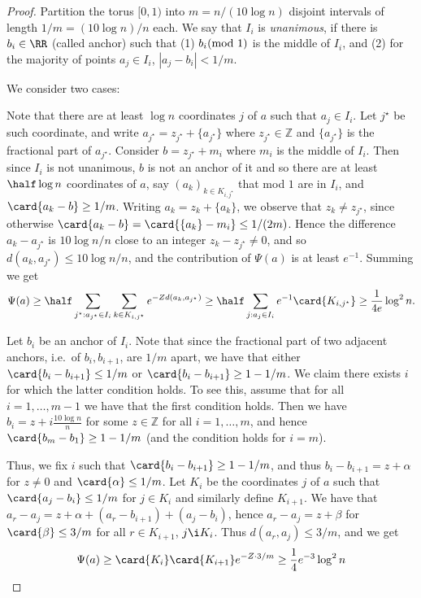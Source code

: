 \begin{proof}
 Partition the torus $[0,1)$ into $m = n/(10 \log n)$ disjoint intervals of length $1/m = (10 \log n)/n$ each.
 We say that $I_i$ is {\em unanimous}, if there is $b_i\in \RR$ (called anchor) such that
 (1) $b_i\hspace{-1ex}\pmod{1}$ is the middle of $I_i$, and (2) for the majority of points $a_j\in I_i$, $|a_j-b_i|< 1/m$.

 We consider two cases:

 Note that there are at least $\log n$ coordinates $j$ of $a$ such that $a_j\in I_i$.
Let $j^{\star}$ be such coordinate, and write $a_{j^{\star}} = z_{j^{\star}} + \{a_{j^{\star}}\}$ where $z_{j^{\star}}\in\mathbb{Z}$ and
$\{a_{j^{\star}}\}$ is the fractional part of $a_{j^{\star}}$. Consider
$b = z_{j^{\star}} + m_i$ where $m_i$ is the middle of $I_i$. Then since $I_i$ is not unanimous, $b$ is not an anchor of it and so there are at least $\half \log n$
coordinates of $a$, say $(a_k)_{k\in K_{i,j^{\star}}}$ that mod $1$ are in $I_i$, and $\card{a_k - b}\geq 1/m$. Writing $a_k = z_k + \{a_k\}$, we observe that $z_k\neq z_{j^{\star}}$,
since otherwise $\card{a_k - b}= \card{\{a_k\} - m_i} \leq 1/(2m)$. Hence the difference $a_k-a_{j^{\star}}$
is $10\log n/n$ close to an integer $z_k-z_{j^{\star}}\neq 0$, and so $d(a_k,a_{j^{\star}})\leq 10\log n/n$, and the contribution of $\Psi(a)$ is
at least $e^{-1}$. Summing we get
\[
\Psi(a)\geq
\half
\sum\limits_{j^{\star}: a_{j^{\star}} \in I_i}
\sum\limits_{k\in K_{i,j^{\star}}}{e^{-Z d(a_k,a_{j^{\star}})}}
\geq
\half
\sum\limits_{j: a_j \in I_i}
e^{-1} \card{K_{i,j^{\star}}}
\geq \frac{1}{4e} \log^2 n.
\]

 Let $b_i$ be an anchor of $I_i$. Note that since the fractional part of two adjacent anchors,
i.e.\ of $b_i,b_{i+1}$, are $1/m$ apart, we have that either $\card{b_i - b_{i+1}}\leq 1/m$ or $\card{b_i-b_{i+1}}\geq 1-1/m$. We claim there exists $i$ for
which the latter condition holds. To see this, assume that for all $i=1,\ldots,m-1$ we have that the first condition holds. Then we have
$b_i = z + i \frac{10\log n}{n}$ for some $z\in \mathbb{Z}$ for all $i=1,\ldots,m$, and hence $\card{b_m - b_1}\geq 1-1/m$ (and the condition holds for $i=m$).

Thus, we fix $i$ such that $\card{b_i-b_{i+1}}\geq 1-1/m$, and thus $b_i - b_{i+1} = z + \alpha$ for $z\neq 0$ and $\card{\alpha}\leq 1/m$.
Let $K_i$ be the coordinates $j$ of $a$ such that $\card{a_j - b_i}\leq 1/m$ for $j\in K_i$
and similarly define $K_{i+1}$.
We have that $a_r - a_j = z + \alpha + (a_r - b_{i+1}) + (a_j - b_i)$, hence $a_r - a_j = z + \beta$ for $\card{\beta}\leq 3/m$ for all $r\in K_{i+1}$, $j\i K_i$.
Thus $d(a_r,a_j)\leq 3/m$, and we get
\[
\Psi(a)\geq \card{K_i}\card{K_{i+1}} e^{-Z\cdot 3/m}\geq \frac{1}{4} e^{-3} \log^2 n\qedhere
\]
\end{proof}


